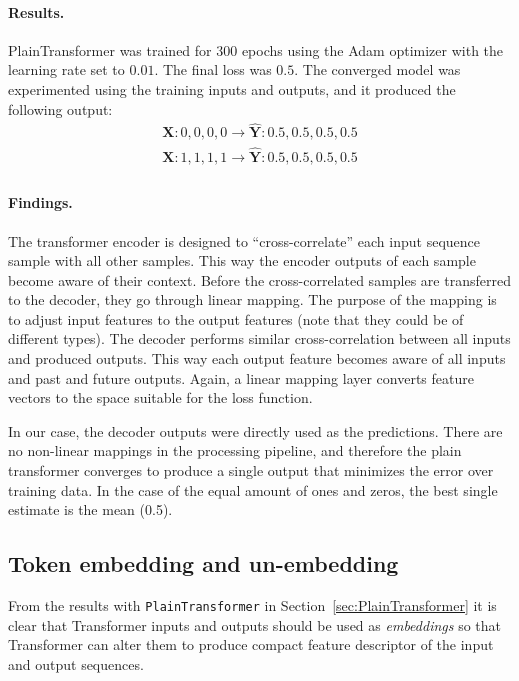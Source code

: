 \documentclass[final]{article}
\begin{document}
\paragraph{Results.} PlainTransformer was trained for 300 epochs using
the Adam optimizer with the learning rate set to $0.01$. The final
loss was $0.5$. The converged model was experimented using the
training inputs and outputs, and it produced the following output:
\begin{displaymath}
  \begin{split}
    \mathbf{X}: 0,0,0,0 \rightarrow \hat{\mathbf{Y}}: 0.5,0.5,0.5,0.5\\
    \mathbf{X}: 1,1,1,1 \rightarrow \hat{\mathbf{Y}}: 0.5,0.5,0.5,0.5\\
  \end{split}
\end{displaymath}

\paragraph{Findings.} The transformer encoder is designed to
``cross-correlate'' each input sequence sample with all other
samples. This way the encoder outputs of each sample become aware of
their context. Before the cross-correlated samples are transferred to
the decoder, they go through linear mapping. The purpose of the
mapping is to adjust input features to the output features (note that
they could be of different types). The decoder performs similar
cross-correlation between all inputs and produced outputs. This way
each output feature becomes aware of all inputs and past and future
outputs. Again, a linear mapping layer converts feature
vectors to the space suitable for the loss function.

In our case, the decoder outputs were directly used as the
predictions. There are no non-linear mappings in the processing
pipeline, and therefore the plain transformer converges to
produce a single output that minimizes the error over training data. In
the case of the equal amount of ones and zeros, the best single
estimate is the mean (0.5).

\subsection{Token embedding and un-embedding}

From the results with \texttt{PlainTransformer} in
Section~\ref{sec:PlainTransformer} it is clear that Transformer inputs
and outputs should be used as \textit{embeddings} so that Transformer
can alter them to produce compact feature descriptor of the input and
output sequences.
\end{document}
